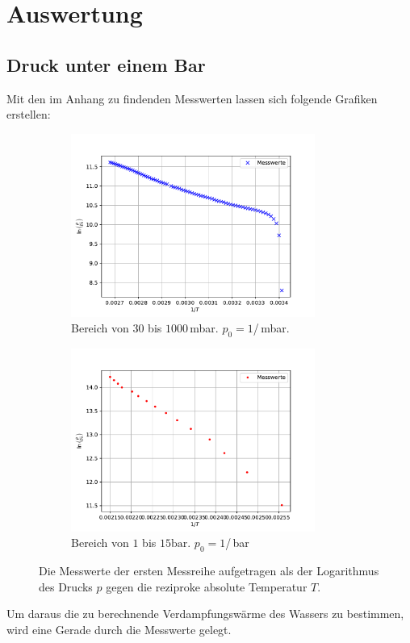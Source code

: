 \newpage
\section{Auswertung}
\label{sec:Auswertung}

\subsection{Druck unter einem Bar}
Mit den im Anhang zu findenden Messwerten lassen sich folgende Grafiken erstellen:
\begin{figure}[H]
  \begin{subfigure}{0.48\textwidth}
      \includegraphics[height=6cm]{plota.pdf}  
    \caption{Bereich von $30$ bis $1000$\,mbar. $p_0=1$/\,mbar.}
    \label{fig:MesswerteKlein}
  \end{subfigure}
  \hfill
  \begin{subfigure}{0.48\textwidth}
    \includegraphics[height=6cm]{plotb.pdf}
    \caption{Bereich von $1$ bis $15 \unit{\bar}$. $p_0=1$/\,bar}
    \label{fig:MesswerteGross}
  \end{subfigure}
  \caption{Die Messwerte der ersten Messreihe aufgetragen als der Logarithmus des Drucks $p$
  gegen die reziproke absolute Temperatur $T$.}
  \label{fig:Teila}
\end{figure}
Um daraus die zu berechnende Verdampfungswärme des Wassers zu bestimmen, wird eine Gerade durch die Messwerte gelegt.
